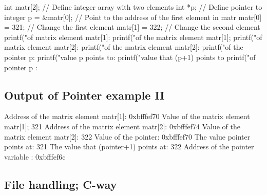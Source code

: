 \documentclass[%
oneside,                 %
final,                   %
10pt]{article}
\begin{document}
\begin{block}{}
\bcppcod
int matr[2];    // Define integer array with two elements
int *p;         // Define pointer to integer
p = &matr[0];   // Point to the address of the first element in matr
matr[0] = 321;  // Change the first element
matr[1] = 322;  // Change the second element
printf("\nAddress of matrix element matr[1]: %
printf("\nValue of the  matrix element  matr[1]; %
printf("\nAddress of matrix element matr[2]: %
printf("\nValue of the matrix element  matr[2]: %
printf("\nValue of the pointer p: %
printf("\nThe value p points to: %
printf("\nThe value that (p+1) points to  %
printf("\nAddress of pointer p : %
\ecppcod
\end{block}


\subsection{Output of Pointer example II}

\begin{block}{}
\bccq
Address of the matrix element matr[1]: 0xbfffef70
Value of the  matrix element  matr[1]; 321
Address of the matrix element matr[2]: 0xbfffef74
Value of the matrix element  matr[2]: 322
Value of the pointer: 0xbfffef70
The value pointer points at: 321
The value that (pointer+1) points at:  322
Address of the pointer variable : 0xbfffef6c
\eccq
\end{block}

\subsection{File handling; C-way}
\end{document}
